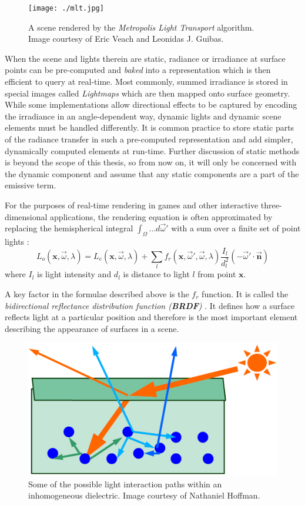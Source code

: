 \begin{figure}[ht!]
  \centering
    \texttt{[image: ./mlt.jpg]}
    \caption[Metropolis Light Transport]{A scene rendered by the \emph{Metropolis Light Transport} algorithm. Image courtesy of Eric Veach and Leonidas J. Guibas.}
  \label{fig:MLT}
\end{figure}

When the scene and lights therein are static, radiance or irradiance at surface points can be pre-computed and \emph{baked} into a representation which is then efficient to query at real-time. Most commonly, summed irradiance is stored in special images called \emph{Lightmaps} \cite{lightmaps} which are then mapped onto surface geometry. While some implementations \cite{Chen08Halo3} allow directional effects to be captured by encoding the irradiance in an angle-dependent way, dynamic lights and dynamic scene elements must be handled differently. It is common practice to store static parts of the radiance transfer in such a pre-computed representation and add simpler, dynamically computed elements at run-time. Further discussion of static methods is beyond the scope of this thesis, so from now on, it will only be concerned with the dynamic component and assume that any static components are a part of the emissive term.

For the purposes of real-time rendering in games and other interactive three-dimensional applications, the rendering equation is often approximated by replacing the hemispherical integral $\int_\Omega \ldots d \overrightarrow{\omega}'$ with a sum over a finite set of point lights \cite{Naty06Reflectance}:
\[
L_o(\mathbf x, \overrightarrow{\omega}, \lambda) = L_e(\mathbf x, \overrightarrow{\omega}, \lambda) + \sum_l f_r(\mathbf x, \overrightarrow{\omega}', \overrightarrow{\omega}, \lambda) \frac{I_l}{d_l^2} (-\overrightarrow{\omega}' \cdot \overrightarrow{\mathbf n})
\]
where $I_l$ is light intensity and $d_l$ is distance to light $l$ from point $\mathbf x$.

A key factor in the formulae described above is the $f_r$ function. It is called the \emph{bidirectional reflectance distribution function (\textbf{BRDF})} \cite{Nicodemus:65}. It defines how a surface reflects light at a particular position and therefore is the most important element describing the appearance of surfaces in a scene.

\begin{figure}[ht!]
  \centering
    \includegraphics[width=0.4\linewidth]{./Chapters/InhomogeneousDielectric.png}
    \caption[Inhomogeneous dielectric]{Some of the possible light interaction paths within an inhomogeneous dielectric. Image courtesy of Nathaniel Hoffman.}
  \label{fig:InhomogeneousDielectric}
\end{figure}

